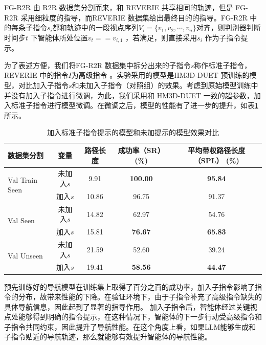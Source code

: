 \documentclass[bachelor]{thesis-uestc}
\begin{document}
FG-R2R 由 R2R 数据集分割而来，和 REVERIE 共享相同的轨迹，但是 FG-R2R 采用细粒度的指导，而REVERIE 数据集给出最终目的的指导。FG-R2R 中的每条子指令$s_i$都和轨迹中的一段视点序列$V_i=\{v_1,v_2,\cdots,v_n\}$对齐，则判别器判断时间步$t$ 下智能体所处位置$v_t == v_{i,1}$  ，若满足，则直接采用$s_i$ 作为子指令提示。

为了表述方便，我们将FG-R2R 数据集中拆分出来的子指令$s$称作标准子指令，REVERIE 中的指令$I$为高级指令 。实验采用的模型是HM3D-DUET 预训练的模型，对比加入子指令$s$和未加入子指令（对照组）的效果。考虑到原始模型训练中并没有加入子指令进行微调，为此，我们采用和 HM3D-DUET 一致的超参数，加入标准子指令进行模型微调。在微调之后，模型的性能有了进一步的提升，如表\ref{table:single_column} 所示。


\begin{table}[htbp]
    \centering
    \caption{加入标准子指令提示的模型和未加提示的模型效果对比}
    \label{table:single_column}
    \begin{tabular}{@{}lcccc@{}}
    \toprule
    \textbf{数据集分割} & \textbf{变量} & \textbf{路径长度} & \textbf{成功率（SR） (\%)} & \textbf{平均带权路径长度（SPL） (\%)} \\ \midrule
    \multirow{2}{*}{Val Train Seen} & 未加入$s$ & 9.91 & \textbf{100.00} & \textbf{95.84} \\
                                    & 加入$s$ & 10.86 & 96.75 & 91.37 \\ \midrule
    \multirow{2}{*}{Val Seen}       & 未加入$s$ & 14.82 & 62.97 & 54.76 \\
                                    & 加入$s$ & 15.81 & \textbf{76.67} & \textbf{65.83} \\ \midrule
    \multirow{2}{*}{Val Unseen}     & 未加入$s$ & 21.59 & 52.60 & 39.24 \\
                                    & 加入$s$ & 19.41 & \textbf{58.56} & \textbf{44.47} \\
    \bottomrule
    \end{tabular}
\end{table}

预先训练好的导航模型在训练集上取得了百分之百的成功率，加入子指令影响了指令的分布，故带来性能的下降。在验证环境下，由于子指令补充了高级指令缺失的具体导航信息，因此起到了显著的指导作用。
加入子指令后，智能体经过关键视点处能够得到明确的指令提示，在这种情况下，智能体的下一步行动受高级指令和子指令共同约束，因此提升了导航性能。在这个角度上看，如果LLM能够生成和子指令贴近的导航轨迹，那么就能够有效提升智能体的导航性能。
\end{document}
